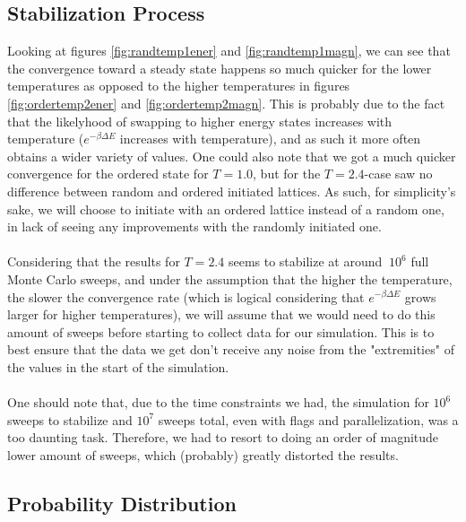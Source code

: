 \documentclass[reprint,english,notitlepage]{revtex4-1}  %
\begin{document}
\subsection{Stabilization Process}

Looking at figures \ref{fig:randtemp1ener} and \ref{fig:randtemp1magn}, we can see that the convergence toward a steady state happens so much quicker for the lower temperatures as opposed to the higher temperatures in figures \ref{fig:ordertemp2ener} and \ref{fig:ordertemp2magn}. This is probably due to the fact that the likelyhood of swapping to higher energy states increases with temperature ($e^{-\beta\Delta E}$ increases with temperature), and as such it more often obtains a wider variety of values. One could also note that we got a much quicker convergence for the ordered state for $T = 1.0$, but for the $T = 2.4$-case saw no difference between random and ordered initiated lattices. As such, for simplicity's sake, we will choose to initiate with an ordered lattice instead of a random one, in lack of seeing any improvements with the randomly initiated one.
\\
\\
Considering that the results for $T = 2.4$ seems to stabilize at around $~10^6$ full Monte Carlo sweeps, and under the assumption that the higher the temperature, the slower the convergence rate (which is logical considering that $e^{-\beta\Delta E}$ grows larger for higher temperatures), we will assume that we would need to do this amount of sweeps before starting to collect data for our simulation. This is to best ensure that the data we get don't receive any noise from the "extremities" of the values in the start of the simulation.
\\
\\
One should note that, due to the time constraints we had, the simulation for $10^6$ sweeps to stabilize and $10^7$ sweeps total, even with flags and parallelization, was a too daunting task. Therefore, we had to resort to doing an order of magnitude lower amount of sweeps, which (probably) greatly distorted the results.

\subsection{Probability Distribution}
\end{document}
